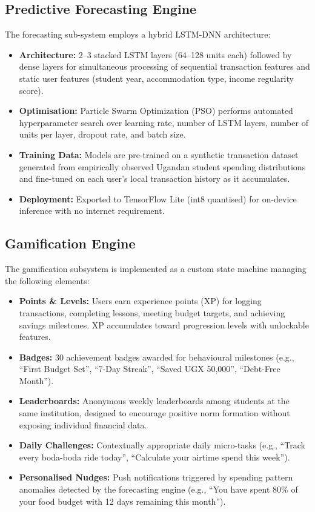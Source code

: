 \documentclass[12pt,a4paper]{report}
\begin{document}
\subsection{Predictive Forecasting Engine}

The forecasting sub-system employs a hybrid LSTM-DNN architecture:

\begin{itemize}
    \item \textbf{Architecture:} 2--3 stacked LSTM layers (64--128 units each) followed by dense layers for simultaneous processing of sequential transaction features and static user features (student year, accommodation type, income regularity score).
    \item \textbf{Optimisation:} Particle Swarm Optimization (PSO) performs automated hyperparameter search over learning rate, number of LSTM layers, number of units per layer, dropout rate, and batch size.
    \item \textbf{Training Data:} Models are pre-trained on a synthetic transaction dataset generated from empirically observed Ugandan student spending distributions and fine-tuned on each user's local transaction history as it accumulates.
    \item \textbf{Deployment:} Exported to TensorFlow Lite (int8 quantised) for on-device inference with no internet requirement.
\end{itemize}

\subsection{Gamification Engine}

The gamification subsystem is implemented as a custom state machine managing the
following elements:

\begin{itemize}
    \item \textbf{Points \& Levels:} Users earn experience points (XP) for logging transactions, completing lessons, meeting budget targets, and achieving savings milestones. XP accumulates toward progression levels with unlockable features.
    \item \textbf{Badges:} 30 achievement badges awarded for behavioural milestones (e.g., ``First Budget Set'', ``7-Day Streak'', ``Saved UGX 50,000'', ``Debt-Free Month'').
    \item \textbf{Leaderboards:} Anonymous weekly leaderboards among students at the same institution, designed to encourage positive norm formation without exposing individual financial data.
    \item \textbf{Daily Challenges:} Contextually appropriate daily micro-tasks (e.g., ``Track every boda-boda ride today'', ``Calculate your airtime spend this week'').
    \item \textbf{Personalised Nudges:} Push notifications triggered by spending pattern anomalies detected by the forecasting engine (e.g., ``You have spent 80\% of your food budget with 12 days remaining this month'').
\end{itemize}
\end{document}
